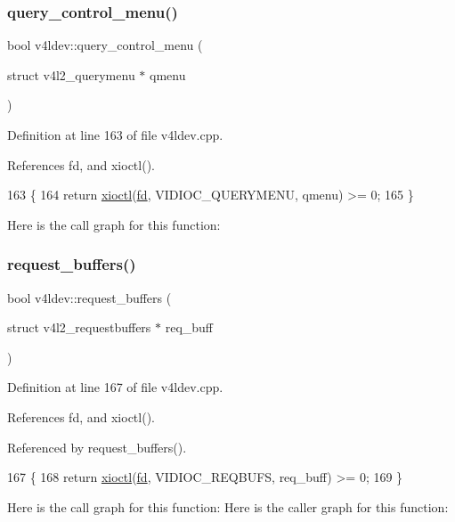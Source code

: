 \subsubsection{\texorpdfstring{query\+\_\+control\+\_\+menu()}{query\_control\_menu()}}
{\footnotesize\ttfamily bool v4ldev\+::query\+\_\+control\+\_\+menu (\begin{DoxyParamCaption}\item[{struct v4l2\+\_\+querymenu $\ast$}]{qmenu }\end{DoxyParamCaption})}



Definition at line 163 of file v4ldev.\+cpp.



References fd, and xioctl().


\begin{DoxyCode}
163                                                              \{
164     \textcolor{keywordflow}{return} \hyperlink{classv4ldev_ab93cb1ab18254ca362310b006bd2552d}{xioctl}(\hyperlink{classv4ldev_a2cd44be3be75a19ab8bec12b28e29142}{fd}, VIDIOC\_QUERYMENU, qmenu) >= 0;
165 \}
\end{DoxyCode}
Here is the call graph for this function\+:
\mbox{\label{classv4ldev_a432cce3442cbc7d5cf7b295073b4ef0a}} 
\subsubsection{\texorpdfstring{request\+\_\+buffers()}{request\_buffers()}\hspace{0.1cm}{\footnotesize\ttfamily [1/2]}}
{\footnotesize\ttfamily bool v4ldev\+::request\+\_\+buffers (\begin{DoxyParamCaption}\item[{struct v4l2\+\_\+requestbuffers $\ast$}]{req\+\_\+buff }\end{DoxyParamCaption})}



Definition at line 167 of file v4ldev.\+cpp.



References fd, and xioctl().



Referenced by request\+\_\+buffers().


\begin{DoxyCode}
167                                                                   \{
168     \textcolor{keywordflow}{return} \hyperlink{classv4ldev_ab93cb1ab18254ca362310b006bd2552d}{xioctl}(\hyperlink{classv4ldev_a2cd44be3be75a19ab8bec12b28e29142}{fd}, VIDIOC\_REQBUFS, req\_buff) >= 0;
169 \}
\end{DoxyCode}
Here is the call graph for this function\+:
Here is the caller graph for this function\+:
\mbox{\label{classv4ldev_a73eafcdc186c7e7e2db2596da1b37e36}} 
